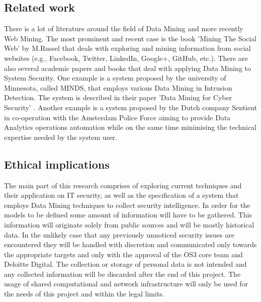 \documentclass[12pt]{article}
\begin{document}
\subsection{Related work}
There is a lot of literature around the field of Data Mining and more recently Web Mining. The most prominent and recent case is the book 'Mining The Social Web' by M.Russel \cite{socialweb} that deals with exploring and mining information from social websites (e.g., Facebook, Twitter, LinkedIn, Google+, GitHub, etc.). There are also several academic papers and books that deal with applying Data Mining to System Security. One example is a system proposed by the university of Minnesota, called MINDS, that employs various Data Mining in Intrusion Detection. The system is described in their paper 'Data Mining for Cyber Security' \cite{minds}.  Another example is a system proposed by the Dutch company Sentient in co-operation with the Amsterdam Police Force \cite{police} aiming to provide Data Analytics operations automation while on the same time minimising the technical expertise needed by the system user. 
\subsection{Ethical implications}

The main part of this research comprises of exploring current techniques and their application on IT security, as well as the specification of a system that employs Data Mining techniques to collect security intelligence. In order for the models to be defined some amount of information will have to be gathered. This information will originate solely from public sources and will be mostly historical data. In the unlikely case that any previously unnoticed security issues are encountered they will be handled with discretion and communicated only towards the appropriate targets and only with the approval of the OS3 core team and Deloitte Digital. The collection or storage of personal data is not intended and any collected information will be discarded after the end of this project. The usage of shared computational and network infrastructure will only be used for the needs of this project and within the legal limits.

\newpage
\end{document}
